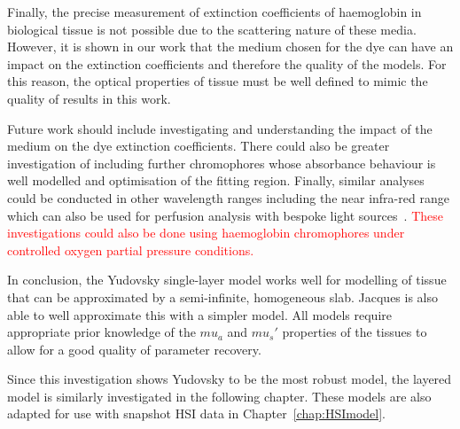 Finally, the precise measurement of extinction coefficients of haemoglobin in biological tissue is not possible due to the scattering nature of these media.
However, it is shown in our work that the medium chosen for the dye can have an impact on the extinction coefficients and therefore the quality of the models. For this reason, the optical properties of tissue must be well defined to mimic the quality of results in this work.

Future work should include 
investigating and understanding the impact of the medium on the dye extinction coefficients.
There could also be greater investigation of including further chromophores whose absorbance behaviour is well modelled and optimisation of the fitting region. 
Finally, similar analyses could be conducted in other wavelength ranges including the near infra-red range which can also be used for perfusion analysis with bespoke light sources~\citep{Hummler2020}. \textcolor{red}{These investigations could also be done using haemoglobin chromophores under controlled oxygen partial pressure conditions.}

In conclusion, the Yudovsky single-layer model works well for modelling of tissue that can be approximated by a semi-infinite, homogeneous slab. Jacques is also able to well approximate this with a simpler model. All models require appropriate prior knowledge of the $mu_a$ and $mu_s'$ properties of the tissues to allow for a good quality of parameter recovery.

Since this investigation shows Yudovsky to be the most robust model, the layered model is similarly investigated in the following chapter. These models are also adapted for use with snapshot HSI data in Chapter~\ref{chap:HSImodel}. 


